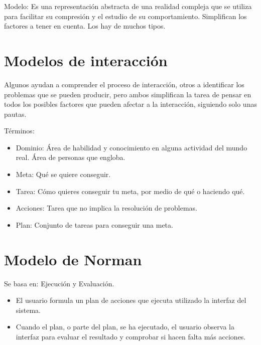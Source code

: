 \documentclass[12pt, twoside, openright]{report} %
\begin{document}
	Modelo: Es una representación abstracta de una realidad compleja que
    se utiliza para facilitar su compresión y el estudio de su
    comportamiento. Simplifican los factores a tener en cuenta. Los hay
    de muchos tipos.

	\pagebreak
\section{Modelos de interacción}

 

    Algunos ayudan a comprender el proceso de interacción, otros a
    identificar los problemas que se pueden producir, pero ambos
    simplifican la tarea de pensar en todos los posibles factores que
    pueden afectar a la interacción, siguiendo solo unas pautas.

	Términos:

    \begin{itemize}
    
    \item
      Dominio: Área de habilidad y conocimiento en alguna actividad del
      mundo real. Área de personas que engloba.
    \item
      Meta: Qué se quiere conseguir.
    \item
      Tarea: Cómo quieres conseguir tu meta, por medio de qué o haciendo
      qué.
    \item
      Acciones: Tarea que no implica la resolución de problemas.
    \item
      Plan: Conjunto de tareas para conseguir una meta.
    \end{itemize}

\section{Modelo de Norman}
\vspace{-0.5cm}
    Se basa en: Ejecución y Evaluación.

    \begin{itemize}
    
    \item
      El usuario formula un plan de acciones que ejecuta utilizado la
      interfaz del sistema.
    \item
      Cuando el plan, o parte del plan, se ha ejecutado, el usuario
      observa la interfaz para evaluar el resultado y comprobar si hacen
      falta más acciones.
    \end{itemize}
\end{document}
